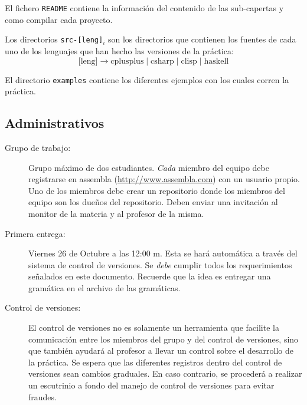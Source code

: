 \documentclass{article}
\theoremstyle{definition}
\begin{document}
\begin{description}
  El fichero \texttt{README} contiene la información del contenido de
  las sub-capertas y como compilar cada proyecto.

  Los directorios \texttt{src-[leng]$_i$} son los directorios que
  contienen los fuentes de cada uno de los lenguajes que han hecho las
  versiones de la práctica:
  \begin{equation*}
    \text{[leng]} \to \text{cplusplus} \mid \text{csharp} \mid \text{clisp} \mid \text{haskell}
  \end{equation*}

  El directorio \texttt{examples} contiene los diferentes ejemplos con
  los cuales corren la práctica.

\end{description}

\subsection{Administrativos}
\label{sec:admin}

\begin{description}
\item[Grupo de trabajo:] Grupo máximo de dos estudiantes. \emph{Cada}
  miembro del equipo debe registrarse en assembla
  (\url{http://www.assembla.com}) con un usuario propio. Uno de los
  miembros debe crear un repositorio donde los miembros del equipo son
  los dueños del repositorio. Deben enviar una invitación al monitor
  de la materia y al profesor de la misma.

\item[Primera entrega:] Viernes 26 de Octubre a las 12:00 m. Esta se
  hará automática a través del sistema de control de versiones. Se
  \emph{debe} cumplir todos los requerimientos señalados en este
  documento. Recuerde que la idea es entregar una gramática en el
  archivo de las gramáticas.

\item[Control de versiones:] El control de versiones no es solamente
  un herramienta que facilite la comunicación entre los miembros del
  grupo y del control de versiones, sino que también ayudará al
  profesor a llevar un control sobre el desarrollo de la práctica. Se
  espera que las diferentes registros dentro del control de versiones
  sean cambios graduales. En caso contrario, se procederá a realizar
  un escutrinio a fondo del manejo de control de versiones para evitar
  fraudes.
\end{description}

\end{document}
